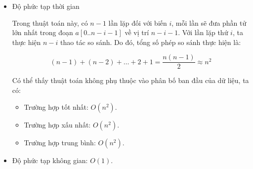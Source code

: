 \begin{itemize}
    \item Độ phức tạp thời gian
    
    Trong thuật toán này, có $n-1$ lần lặp đối với biến $i$, mỗi lần 
    sẽ đưa phần tử lớn nhất trong đoạn $a\left[0..n-i-1\right]$ về 
    vị trí $n-i-1$. Với lần lặp thứ $i$, ta thực hiện $n-i$ 
    thao tác so sánh. Do đó, tổng số phép so sánh thực hiện là:
    
    \begin{equation}
        \left(n-1\right)+\left(n-2\right)+\ldots+2+1
        =\frac{n\left(n-1\right)}{2}\approx n^2
    \end{equation}
        
    Có thể thấy thuật toán không phụ thuộc vào phân bố ban đầu của dữ 
    liệu, ta có:
    
    \begin{itemize}[label=$\circ$]
        \item Trường hợp tốt nhất: $O\left(n^2\right)$.
        \item Trường hợp xấu nhất: $O\left(n^2\right)$.
        \item Trường hợp trung bình: $O\left(n^2\right)$.
    \end{itemize}
    
    \item Độ phức tạp không gian: $O\left(1\right)$.
\end{itemize}